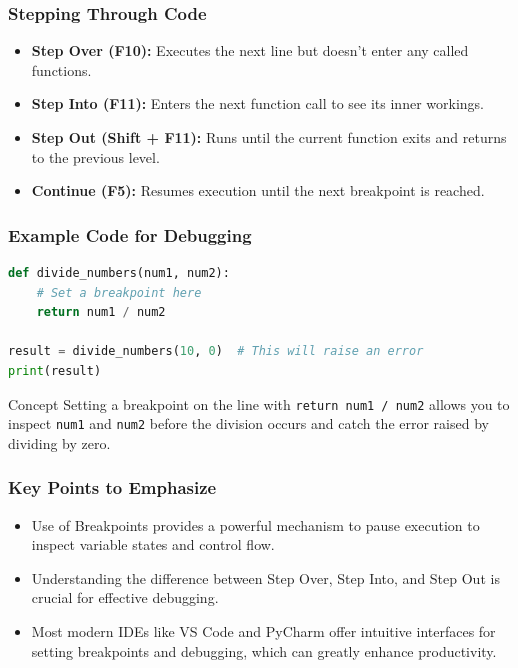 \documentclass{beamer}
\begin{document}
\begin{frame}[fragile]
    \frametitle{Stepping Through Code}
    \begin{itemize}
        \item \textbf{Step Over (F10):} Executes the next line but doesn’t enter any called functions.
        
        \item \textbf{Step Into (F11):} Enters the next function call to see its inner workings.
        
        \item \textbf{Step Out (Shift + F11):} Runs until the current function exits and returns to the previous level.
        
        \item \textbf{Continue (F5):} Resumes execution until the next breakpoint is reached.
    \end{itemize}
\end{frame}

\begin{frame}[fragile]
    \frametitle{Example Code for Debugging}
    \begin{lstlisting}[language=Python]
def divide_numbers(num1, num2):
    # Set a breakpoint here
    return num1 / num2

result = divide_numbers(10, 0)  # This will raise an error
print(result)
    \end{lstlisting}

    \begin{block}{Concept}
        Setting a breakpoint on the line with \texttt{return num1 / num2} allows you to 
        inspect \texttt{num1} and \texttt{num2} before the division occurs and 
        catch the error raised by dividing by zero.
    \end{block}
\end{frame}

\begin{frame}[fragile]
    \frametitle{Key Points to Emphasize}
    \begin{itemize}
        \item Use of Breakpoints provides a powerful mechanism to pause execution to inspect variable states and control flow.
        
        \item Understanding the difference between Step Over, Step Into, and Step Out is crucial for effective debugging.
        
        \item Most modern IDEs like VS Code and PyCharm offer intuitive interfaces for setting breakpoints and debugging, which can greatly enhance productivity.
    \end{itemize}
\end{frame}
\end{document}
